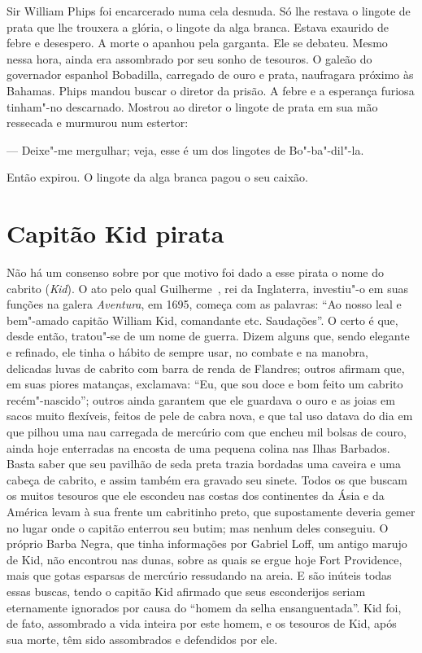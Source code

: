 Sir William Phips foi encarcerado numa cela desnuda. Só lhe restava o
lingote de prata que lhe trouxera a glória, o lingote da alga branca.
Estava exaurido de febre e desespero. A morte o apanhou pela garganta. Ele
se debateu. Mesmo nessa hora, ainda era assombrado por seu sonho de
tesouros. O galeão do governador espanhol Bobadilla, carregado de ouro e
prata, naufragara próximo às Bahamas. Phips mandou buscar o diretor da
prisão. A febre e a esperança furiosa tinham"-no descarnado. Mostrou ao
diretor o lingote de prata em sua mão ressecada e murmurou num estertor:

--- Deixe"-me mergulhar; veja, esse é um dos lingotes de Bo"-ba"-dil"-la.

Então expirou. O lingote da alga branca pagou o seu caixão.

\chapter{Capitão Kid pirata}

Não há um consenso sobre por que motivo foi dado a esse pirata o nome do
cabrito (\textit{Kid}). O ato pelo qual Guilherme~, rei da Inglaterra,
investiu"-o em suas funções na galera \textit{Aventura}, em 1695, começa
com as palavras: “Ao nosso leal e bem"-amado capitão William Kid,
comandante etc. Saudações”. O certo é que, desde então, tratou"-se de um
nome de guerra. Dizem alguns que, sendo elegante e refinado, ele tinha o
hábito de sempre usar, no combate e na manobra, delicadas luvas de cabrito
com barra de renda de Flandres; outros afirmam que, em suas piores
matanças, exclamava: “Eu, que sou doce e bom feito um cabrito
recém"-nascido”; outros ainda garantem que ele guardava o ouro e as joias
em sacos muito flexíveis, feitos de pele de cabra nova, e que tal uso
datava do dia em que pilhou uma nau carregada de mercúrio com que encheu
mil bolsas de couro, ainda hoje enterradas na encosta de uma pequena
colina nas Ilhas Barbados. Basta saber que seu pavilhão de seda preta
trazia bordadas uma caveira e uma cabeça de cabrito, e assim também era
gravado seu sinete. Todos os que buscam os muitos tesouros que ele
escondeu nas costas dos continentes da Ásia e da América levam à sua
frente um cabritinho preto, que supostamente deveria gemer no lugar onde o
capitão enterrou seu butim; mas nenhum deles conseguiu. O próprio Barba
Negra, que tinha informações por Gabriel Loff, um antigo marujo de Kid,
não encontrou nas dunas, sobre as quais se ergue hoje Fort Providence,
mais que gotas esparsas de mercúrio ressudando na areia. E são inúteis
todas essas buscas, tendo o capitão Kid afirmado que seus esconderijos
seriam eternamente ignorados por causa do “homem da selha ensanguentada”.
Kid foi, de fato, assombrado a vida inteira por este homem, e os tesouros
de Kid, após sua morte, têm sido assombrados e defendidos por ele.

